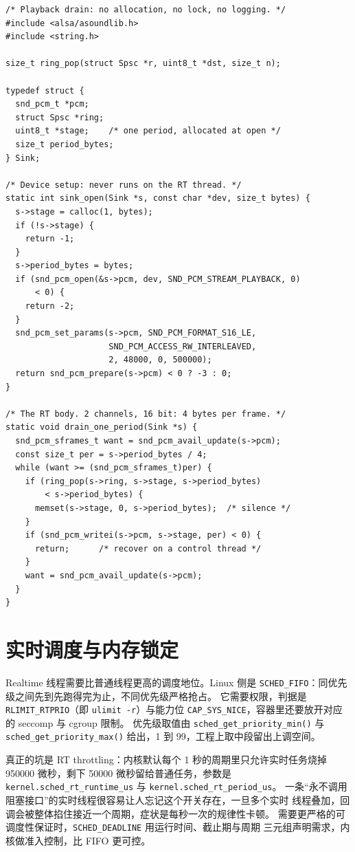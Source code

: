 \documentclass[12pt,a4paper,fontset=fandol]{ctexbook}
\newcommand{\Fn}[1]{\texttt{#1()}}
\newcommand{\Tp}[1]{\texttt{#1}}
\newcommand{\Lang}[1]{\textsf{#1}}
\newcommand{\DomRT}{\Lang{Realtime}}
\begin{document}
\begin{lstlisting}[style=cstyle,caption={ALSA 播放回调：只做搬运、补静音与游标推进},label={lst:ch12-alsa}]
/* Playback drain: no allocation, no lock, no logging. */
#include <alsa/asoundlib.h>
#include <string.h>

size_t ring_pop(struct Spsc *r, uint8_t *dst, size_t n);

typedef struct {
  snd_pcm_t *pcm;
  struct Spsc *ring;
  uint8_t *stage;    /* one period, allocated at open */
  size_t period_bytes;
} Sink;

/* Device setup: never runs on the RT thread. */
static int sink_open(Sink *s, const char *dev, size_t bytes) {
  s->stage = calloc(1, bytes);
  if (!s->stage) {
    return -1;
  }
  s->period_bytes = bytes;
  if (snd_pcm_open(&s->pcm, dev, SND_PCM_STREAM_PLAYBACK, 0)
      < 0) {
    return -2;
  }
  snd_pcm_set_params(s->pcm, SND_PCM_FORMAT_S16_LE,
                     SND_PCM_ACCESS_RW_INTERLEAVED,
                     2, 48000, 0, 500000);
  return snd_pcm_prepare(s->pcm) < 0 ? -3 : 0;
}

/* The RT body. 2 channels, 16 bit: 4 bytes per frame. */
static void drain_one_period(Sink *s) {
  snd_pcm_sframes_t want = snd_pcm_avail_update(s->pcm);
  const size_t per = s->period_bytes / 4;
  while (want >= (snd_pcm_sframes_t)per) {
    if (ring_pop(s->ring, s->stage, s->period_bytes)
        < s->period_bytes) {
      memset(s->stage, 0, s->period_bytes);  /* silence */
    }
    if (snd_pcm_writei(s->pcm, s->stage, per) < 0) {
      return;      /* recover on a control thread */
    }
    want = snd_pcm_avail_update(s->pcm);
  }
}
\end{lstlisting}

\section{实时调度与内存锁定}

\DomRT{} 线程需要比普通线程更高的调度地位。Linux 侧是
\Tp{SCHED\_FIFO}：同优先级之间先到先跑得完为止，不同优先级严格抢占。
它需要权限，判据是 \Tp{RLIMIT\_RTPRIO}（即 \Tp{ulimit -r}）与能力位
\Tp{CAP\_SYS\_NICE}，容器里还要放开对应的 seccomp 与 cgroup 限制。
优先级取值由 \Fn{sched\_get\_priority\_min} 与 \Fn{sched\_get\_priority\_max}
给出，1 到 99，工程上取中段留出上调空间。

真正的坑是 RT throttling：内核默认每个 1 秒的周期里只允许实时任务烧掉
950000 微秒，剩下 50000 微秒留给普通任务，参数是
\Tp{kernel.sched\_rt\_runtime\_us} 与 \Tp{kernel.sched\_rt\_period\_us}。
一条``永不调用阻塞接口''的实时线程很容易让人忘记这个开关存在，一旦多个实时
线程叠加，回调会被整体掐住接近一个周期，症状是每秒一次的规律性卡顿。
需要更严格的可调度性保证时，\Tp{SCHED\_DEADLINE} 用运行时间、截止期与周期
三元组声明需求，内核做准入控制，比 FIFO 更可控。
\end{document}
